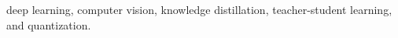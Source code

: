 \documentclass[conference]{IEEEtran}
\begin{document}
\begin{IEEEkeywords}
    deep learning, computer vision, knowledge distillation, teacher-student learning, and quantization.
\end{IEEEkeywords}













\printglossary[type=\acronymtype]
\end{document}
